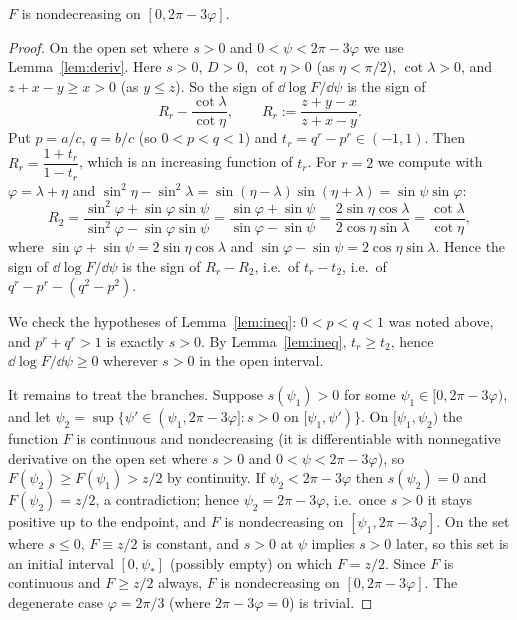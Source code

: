 \begin{proposition}\label{prop:mono}
$F$ is nondecreasing on $[0,2\pi-3\varphi]$.
\end{proposition}
\begin{proof}
On the open set where $s>0$ and $0<\psi<2\pi-3\varphi$ we use Lemma~\ref{lem:deriv}. Here $s>0$, $D>0$, $\cot\eta>0$ (as $\eta<\pi/2$), $\cot\lambda>0$, and $z+x-y\ge x>0$ (as $y\le z$). So the sign of $\dd\log F/\dd\psi$ is the sign of
\[
R_r-\frac{\cot\lambda}{\cot\eta},\qquad R_r:=\frac{z+y-x}{z+x-y}.
\]
Put $p=a/c$, $q=b/c$ (so $0<p<q<1$) and $t_r=q^r-p^r\in(-1,1)$. Then $R_r=\dfrac{1+t_r}{1-t_r}$, which is an increasing function of $t_r$. For $r=2$ we compute with $\varphi=\lambda+\eta$ and $\sin^2\eta-\sin^2\lambda=\sin(\eta-\lambda)\sin(\eta+\lambda)=\sin\psi\sin\varphi$:
\[
R_2=\frac{\sin^2\varphi+\sin\varphi\sin\psi}{\sin^2\varphi-\sin\varphi\sin\psi}=\frac{\sin\varphi+\sin\psi}{\sin\varphi-\sin\psi}=\frac{2\sin\eta\cos\lambda}{2\cos\eta\sin\lambda}=\frac{\cot\lambda}{\cot\eta},
\]
where $\sin\varphi+\sin\psi=2\sin\eta\cos\lambda$ and $\sin\varphi-\sin\psi=2\cos\eta\sin\lambda$. Hence the sign of $\dd\log F/\dd\psi$ is the sign of $R_r-R_2$, i.e.\ of $t_r-t_2$, i.e.\ of $q^r-p^r-(q^2-p^2)$.

We check the hypotheses of Lemma~\ref{lem:ineq}: $0<p<q<1$ was noted above, and $p^r+q^r>1$ is exactly $s>0$. By Lemma~\ref{lem:ineq}, $t_r\ge t_2$, hence $\dd\log F/\dd\psi\ge0$ wherever $s>0$ in the open interval.

It remains to treat the branches. Suppose $s(\psi_1)>0$ for some $\psi_1\in[0,2\pi-3\varphi)$, and let $\psi_2=\sup\{\psi'\in(\psi_1,2\pi-3\varphi]: s>0\text{ on }[\psi_1,\psi')\}$. On $[\psi_1,\psi_2)$ the function $F$ is continuous and nondecreasing (it is differentiable with nonnegative derivative on the open set where $s>0$ and $0<\psi<2\pi-3\varphi$), so $F(\psi_2)\ge F(\psi_1)>z/2$ by continuity. If $\psi_2<2\pi-3\varphi$ then $s(\psi_2)=0$ and $F(\psi_2)=z/2$, a contradiction; hence $\psi_2=2\pi-3\varphi$, i.e.\ once $s>0$ it stays positive up to the endpoint, and $F$ is nondecreasing on $[\psi_1,2\pi-3\varphi]$. On the set where $s\le0$, $F\equiv z/2$ is constant, and $s>0$ at $\psi$ implies $s>0$ later, so this set is an initial interval $[0,\psi_*]$ (possibly empty) on which $F=z/2$. Since $F$ is continuous and $F\ge z/2$ always, $F$ is nondecreasing on $[0,2\pi-3\varphi]$. The degenerate case $\varphi=2\pi/3$ (where $2\pi-3\varphi=0$) is trivial.
\end{proof}

